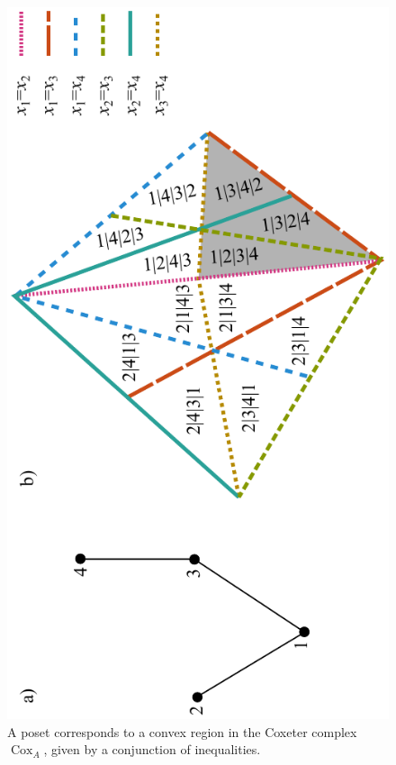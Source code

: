 \documentclass[12pt,reqno]{amsart}
\numberwithin{definition}{section}
\theoremstyle{definition}
\newcommand{\cox}{\operatorname{Cox}}
\begin{document}
\begin{figure}[h]
\includegraphics[angle=270,width=5in]{coxeter_complex_poset}
\caption{A poset corresponds to a convex region in the Coxeter complex $\cox_A$, given by a conjunction of inequalities.}
\label{fig:poset}
\end{figure}
\end{document}

